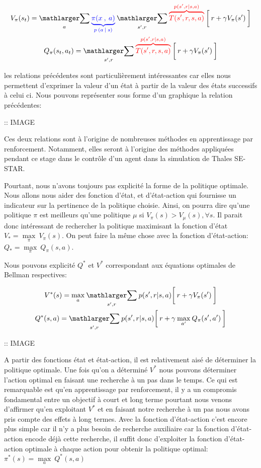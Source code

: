 \begin{gather}
V_\pi(s_t) = \underset{a}{\bsum}\: \policyc{blue} \:\underset{s', r}{\bsum}\:\dynamicsc{red}\: \bigg[\: r + \gamma V_\pi(s') \:\bigg] \\
Q_\pi(s_t, a_t) = \underset{s', r}{\bsum}\:\dynamicsc{red}\: \bigg[\: r + \gamma V_\pi(s') \:\bigg] 
\end{gather}

\bigskip

les relations précédentes sont particulièrement intéressantes car elles nous permettent d'exprimer la valeur d'un état à partir de la valeur des états successifs à celui ci. Nous pouvons représenter sous forme d'un graphique la relation précédentes:

:: IMAGE

Ces deux relations sont à l'origine de nombreuses méthodes en apprentissage par renforcement. Notamment, elles seront à l'origine des méthodes appliquées pendant ce stage dans le contrôle d'un agent dans la simulation de Thales SE-STAR.

Pourtant, nous n'avons toujours pas explicité la forme de la politique optimale. Nous allons nous aider des fonction d'état, et d'état-action qui fournisse un indicateur sur la pertinence de la politique choisie. Ainsi, on pourra dire qu'une politique $\pi$ est meilleurs qu'une politique $\mu$ si $V_\pi(s) > V_\mu(s), \forall s $. Il parait donc intéressant de rechercher la politique maximisant la fonction d'état $ V_* = \underset{\pi}{\max} \:V_\pi(s) $. On peut faire la même chose avec la fonction d'état-action: $ Q_* = \underset{\pi}{\max} \:Q_\pi(s, a) $.

Nous pouvons explicité $Q^*$ et $V^*$ correspondant aux équations optimales de Bellman respectives:

\begin{gather}
V^*(s) = \underset{a}{\max} \: \underset{s', r}{\bsum} \: p(s',r \vert s, a) \bigg[\: r + \gamma V_\pi(s') \:\bigg]
\\
Q^*(s, a) = \underset{s', r}{\bsum} \: p(s',r \vert s, a) \bigg[\: r + \gamma \: \underset{a'}{\max} \: Q_\pi(s', a') \:\bigg]
\end{gather}
\bigskip

:: IMAGE

A partir des fonctions état et état-action, il est relativement aisé de déterminer la politique optimale. Une fois qu'on a déterminé $V^*$ nous pouvons déterminer l'action optimal en faisant une recherche à un pas dans le temps. Ce qui est remarquable est qu'en apprentissage par renforcement, il y a un compromis fondamental entre un objectif à court et long terme pourtant nous venons d'affirmer qu'en exploitant $V^*$ et en faisant notre recherche à un pas nous avons pris compte des effets à long termes. Avec la fonction d'état-action c'est encore plus simple car il n'y a plus besoin de recherche auxiliaire car la fonction d'état-action encode déjà cette recherche, il suffit donc d'exploiter la fonction d'état-action optimale à chaque action pour obtenir la politique optimal: $\pi^*(s) = \underset{a}{\max}\:Q^*(s,a)$ 

